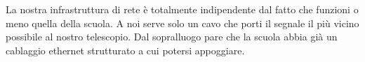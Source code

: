 \documentclass[a4paper,12pt]{article}
\begin{document}
La nostra infrastruttura di rete \`e totalmente indipendente dal fatto che funzioni o meno quella della scuola. A noi serve solo un cavo che porti il segnale il pi\`u vicino possibile al nostro telescopio. Dal sopralluogo pare che la scuola abbia gi\`a un cablaggio ethernet strutturato a cui potersi appoggiare.
\end{document}

